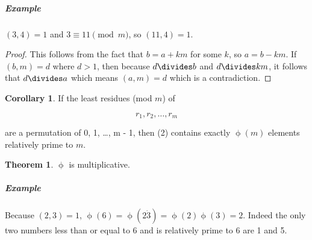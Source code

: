 \documentclass{article}
\theoremstyle{definition} %
\newtheorem{theorem}{Theorem}[section] %
\theoremstyle{definition}
\newtheorem{corollary}{Corollary}[section] %
\theoremstyle{definition}
\newcommand{\tot}{\upphi}
\theoremstyle{definition}
\begin{document}
  \subparagraph{Example} $(3, 4) = 1$ and $3 \equiv 11 \pmod{m}$, so $(11, 4) = 1$.
  
  \begin{proof}
    This follows from the fact that $b = a + km$ for some $k$, so $a = b - km$.
    If $(b, m) = d$ where $d > 1$, then because $d \divides b$ and $d \divides km$,
    it follows that $d \divides a$ which means $(a, m) = d$ which is a contradiction.
  \end{proof}
  
  \begin{corollary}
  If the least residues (mod $m$) of
  
  \begin{equation}
    r_1, r_2, \dots, r_m
  \end{equation}
  
  are a permutation of 0, 1, \dots, m - 1, then (2) contains exactly $\tot(m)$ elements
  relatively prime to $m$.
  \end{corollary}
  
  \begin{theorem}
    $\tot$ is multiplicative.
  \end{theorem}
  
  \subparagraph{Example} Because $(2, 3) = 1$, $\tot(6) = \tot(2\dot 3) = \tot(2)\tot(3) = 2$.
  Indeed the only two numbers less than or equal to 6 and is relatively prime to 6 are 1 and 5.
  
\end{document}
